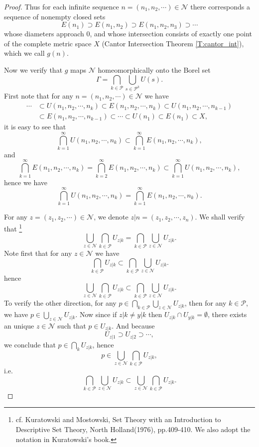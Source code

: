 \begin{proof}
Thus for each infinite sequence $n=(n_1,n_2,\cdots)\in\mathcal{N}$ there
corresponds a sequence of nonempty closed sets
\[
  E(n_1)\supset E(n_1,n_2) \supset E(n_1,n_2,n_3) \supset \cdots
\]
whose diameters approach $0$, and whose intersection consists of exactly one
point of the complete metric space $X$ (Cantor Intersection Theorem 
\ref{T:cantor_int}), which we call $g(n)$.

Now we verify that $g$ maps $\mathcal{N}$ homeomorphically onto the Borel set
\[
	\Gamma = \bigcap_{k\in\mathcal{P}} \bigcup_{s\in\mathcal{P}^k} U(s).
\]
First note that for any $n=(n_1,n_2,\cdots)\in\mathcal{N}$ we have
\begin{align*}
	\cdots 
	&\subset U(n_1,n_2,\cdots,n_k) \subset E(n_1,n_2,\cdots,n_k)
  	\subset U(n_1,n_2,\cdots,n_{k-1})  \\
	&\subset E(n_1,n_2,\cdots,n_{k-1})
  	\subset \cdots \subset U(n_1) \subset E(n_1) \subset X,
\end{align*}
it is easy to see that 
\[
	\bigcap_{k=1}^{\infty} U(n_1,n_2,\cdots,n_k) 
	  \subset \bigcap_{k=1}^{\infty} E(n_1,n_2,\cdots,n_k),
\]
and
\[
	\bigcap_{k=1}^{\infty} E(n_1,n_2,\cdots,n_k)
	= \bigcap_{k=2}^{\infty} E(n_1,n_2,\cdots,n_k)
	\subset \bigcap_{k=1}^{\infty} U(n_1,n_2,\cdots,n_k),
\]
hence we have
\[
	\bigcap_{k=1}^{\infty} U(n_1,n_2,\cdots,n_k) 
	= \bigcap_{k=1}^{\infty} E(n_1,n_2,\cdots,n_k).
\]

For any $z=(z_1,z_2,\cdots)\in \mathcal{N}$, we denote 
$z|n=(z_1,z_2,\cdots,z_n)$. We shall verify that
\footnote{cf. Kuratowski and Mostowski, Set Theory with an Introduction to
Descriptive Set Theory, North Holland(1976), pp.409-410. We also adopt the 
notation in Kuratowski's book.}
\[
	\bigcup_{z\in\mathcal{N}} \bigcap_{k\in\mathcal{P}} U_{z|k}
	  =\bigcap_{k\in\mathcal{P}} \bigcup_{z\in\mathcal{N}} U_{z|k}.
\]
Note first that for any $z\in\mathcal{N}$ we have
\[
	\bigcap_{k\in\mathcal{P}} U_{z|k}
	  \subset\bigcap_{k\in\mathcal{P}} \bigcup_{z\in\mathcal{N}} U_{z|k}.
\]
hence
\[
	\bigcup_{z\in\mathcal{N}} \bigcap_{k\in\mathcal{P}} U_{z|k}
	  \subset\bigcap_{k\in\mathcal{P}} \bigcup_{z\in\mathcal{N}} U_{z|k}.
\]
To verify the other direction, for any 
$p\in\bigcap_{k\in\mathcal{P}} \bigcup_{z\in\mathcal{N}} U_{z|k}$, then
for any $k\in\mathcal{P}$, we have $p\in\bigcup_{z\in\mathcal{N}} U_{z|k}$.
Now since if $z|k\neq y|k$ then $U_{z|k}\cap U_{y|k}=\emptyset$, there exists
an unique $z\in\mathcal{N}$ such that $p\in U_{z|k}$. And because
\[
	U_{z|1} \supset U_{z|2} \supset \cdots,
\]
we conclude that $p\in\bigcap_k U_{z|k}$, hence
\[
	p\in\bigcup_{z\in\mathcal{N}} \bigcap_{k\in\mathcal{P}} U_{z|k},
\]
i.e.
\[
	\bigcap_{k\in\mathcal{P}} \bigcup_{z\in\mathcal{N}} U_{z|k}
	  \subset\bigcup_{z\in\mathcal{N}} \bigcap_{k\in\mathcal{P}} U_{z|k}.
\]


\end{proof}
